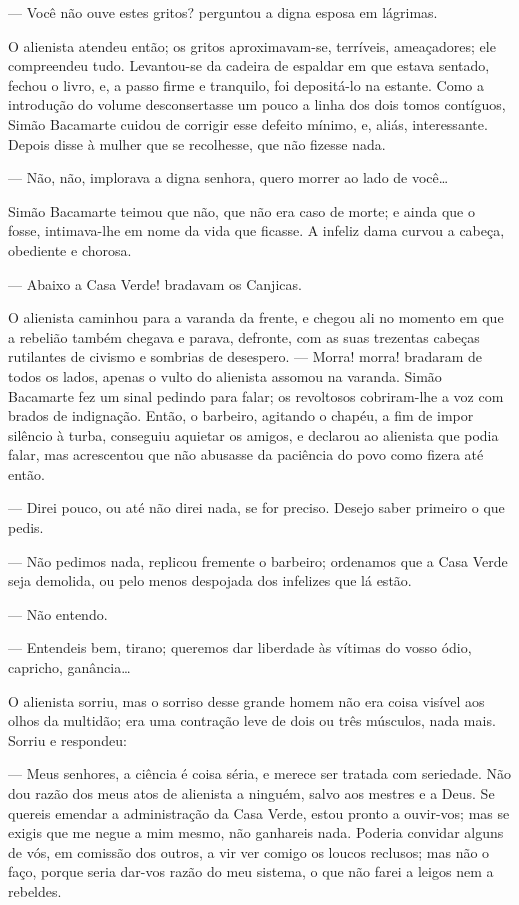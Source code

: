 --- Você não ouve estes gritos? perguntou a digna esposa em lágrimas.

O alienista atendeu então; os gritos aproximavam-se, terríveis,
ameaçadores; ele compreendeu tudo. Levantou-se da cadeira de espaldar em
que estava sentado, fechou o livro, e, a passo firme e tranquilo, foi
depositá-lo na estante. Como a introdução do volume desconsertasse um
pouco a linha dos dois tomos contíguos, Simão Bacamarte cuidou de
corrigir esse defeito mínimo, e, aliás, interessante. Depois disse à
mulher que se recolhesse, que não fizesse nada.

--- Não, não, implorava a digna senhora, quero morrer ao lado de você\ldots{}

Simão Bacamarte teimou que não, que não era caso de morte; e ainda que o
fosse, intimava-lhe em nome da vida que ficasse. A infeliz dama curvou a
cabeça, obediente e chorosa.

--- Abaixo a Casa Verde! bradavam os Canjicas.

O alienista caminhou para a varanda da frente, e chegou ali no momento
em que a rebelião também chegava e parava, defronte, com as suas
trezentas cabeças rutilantes de civismo e sombrias de desespero. ---
Morra! morra! bradaram de todos os lados, apenas o vulto do alienista
assomou na varanda. Simão Bacamarte fez um sinal pedindo para falar; os
revoltosos cobriram-lhe a voz com brados de indignação. Então, o
barbeiro, agitando o chapéu, a fim de impor silêncio à turba, conseguiu
aquietar os amigos, e declarou ao alienista que podia falar, mas
acrescentou que não abusasse da paciência do povo como fizera até então.

--- Direi pouco, ou até não direi nada, se for preciso. Desejo saber
primeiro o que pedis.

--- Não pedimos nada, replicou fremente o barbeiro; ordenamos que a Casa
Verde seja demolida, ou pelo menos despojada dos infelizes que lá estão.

--- Não entendo.

--- Entendeis bem, tirano; queremos dar liberdade às vítimas do vosso
ódio, capricho, ganância\ldots{}

O alienista sorriu, mas o sorriso desse grande homem não era coisa
visível aos olhos da multidão; era uma contração leve de dois ou três
músculos, nada mais. Sorriu e respondeu:

--- Meus senhores, a ciência é coisa séria, e merece ser tratada com
seriedade. Não dou razão dos meus atos de alienista a ninguém, salvo aos
mestres e a Deus. Se quereis emendar a administração da Casa Verde,
estou pronto a ouvir-vos; mas se exigis que me negue a mim mesmo, não
ganhareis nada. Poderia convidar alguns de vós, em comissão dos outros,
a vir ver comigo os loucos reclusos; mas não o faço, porque seria
dar-vos razão do meu sistema, o que não farei a leigos nem a rebeldes.

